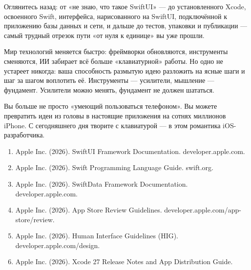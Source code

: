 Оглянитесь назад: от «не знаю, что такое SwiftUI» — до установленного Xcode, освоенного Swift, интерфейса, нарисованного на SwiftUI, подключённой к приложению базы данных и сети, и дальше до тестов, упаковки и публикации — самый трудный отрезок пути «от нуля к единице» вы уже прошли.

Мир технологий меняется быстро: фреймворки обновляются, инструменты сменяются, ИИ забирает всё больше «клавиатурной» работы. Но одно не устареет никогда: ваша способность размытую идею разложить на ясные шаги и шаг за шагом воплотить её. Инструменты — усилители, мышление — фундамент. Усилители можно менять, фундамент не должен шататься.

Вы больше не просто «умеющий пользоваться телефоном». Вы можете превратить идеи из головы в настоящие приложения на сотнях миллионов iPhone. С сегодняшнего дня творите с клавиатурой — в этом романтика iOS-разработчика.


\begin{enumerate}
  \item Apple Inc. (2026). SwiftUI Framework Documentation. developer.apple.com.
  \item Apple Inc. (2026). Swift Programming Language Guide. swift.org.
  \item Apple Inc. (2026). SwiftData Framework Documentation. developer.apple.com.
  \item Apple Inc. (2026). App Store Review Guidelines. developer.apple.com/app-store/review.
  \item Apple Inc. (2026). Human Interface Guidelines (HIG). developer.apple.com/design.
  \item Apple Inc. (2026). Xcode 27 Release Notes and App Distribution Guide.
\end{enumerate}
